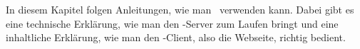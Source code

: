 

In diesem Kapitel folgen Anleitungen, wie man \ZELIA\ verwenden kann. Dabei gibt es eine technische Erklärung, wie man den \ZELIA-Server zum Laufen bringt und eine inhaltliche Erklärung, wie man den \ZELIA-Client, also die Webseite, richtig bedient.





